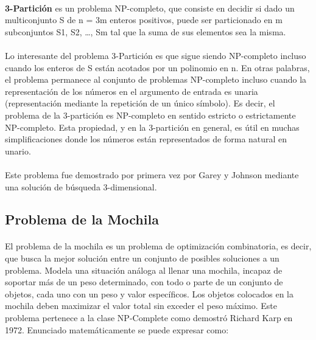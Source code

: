 \documentclass[11pt, a4paper,spanish]{article}
\begin{document}
				\paragraph{}
				{\bf 3-Partición} es un problema NP-completo, que consiste en decidir si dado un multiconjunto S de n = 3m enteros positivos, puede ser particionado en m subconjuntos S1, S2, …, Sm tal que la suma de sus elementos sea la misma.
			
				\paragraph{}
				Lo interesante del problema 3-Partición es que sigue siendo NP-completo incluso cuando los enteros de S están acotados por un polinomio en n. En otras palabras, el problema permanece al conjunto de problemas NP-completo incluso cuando la representación de los números en el argumento de entrada es unaria (representación mediante la repetición de un único símbolo). Es decir, el problema de la 3-partición es NP-completo en sentido estricto o estrictamente NP-completo. Esta propiedad, y en la 3-partición en general, es útil en muchas simplificaciones donde los números están representados de forma natural en unario.
	
				\paragraph{}
				Este problema fue demostrado por primera vez por Garey y Johnson mediante una solución de búsqueda 3-dimensional.
		
			\subsection{Problema de la Mochila}
				
				\paragraph{}
				El problema de la mochila es un problema de optimización combinatoria, es decir, que busca la mejor solución entre un conjunto de posibles soluciones a un problema. Modela una situación análoga al llenar una mochila, incapaz de soportar más de un peso determinado, con todo o parte de un conjunto de objetos, cada uno con un peso y valor específicos. Los objetos colocados en la mochila deben maximizar el valor total sin exceder el peso máximo. Este problema pertenece a la clase NP-Complete como demostró  Richard Karp en 1972. Enunciado matemáticamente se puede expresar como: 
				
\end{document}
